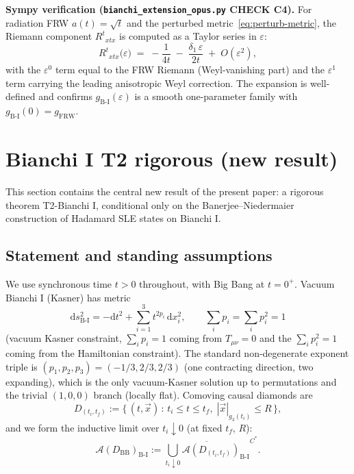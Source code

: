 \documentclass[11pt]{article}
\theoremstyle{definition}
\renewcommand{\AA}{\mathcal{A}}
\newcommand{\FRW}{\mathrm{FRW}}
\newcommand{\BI}{\mathrm{B\text{-}I}}
\newcommand{\BB}{\mathrm{BB}}
\begin{document}
\noindent\textbf{Sympy verification (\texttt{bianchi\_extension\_opus.py} CHECK C4).} For radiation FRW $a(t)=\sqrt t$ and the perturbed metric~\eqref{eq:perturb-metric}, the Riemann component $R^t{}_{xtx}$ is computed as a Taylor series in $\varepsilon$:
\begin{equation*}
R^t{}_{xtx}\bigl(\varepsilon\bigr)
   \;=\; -\frac{1}{4t} \;-\; \frac{\delta_1\,\varepsilon}{2t}\;+\;O(\varepsilon^2),
\end{equation*}
with the $\varepsilon^0$ term equal to the FRW Riemann (Weyl-vanishing part) and the $\varepsilon^1$ term carrying the leading anisotropic Weyl correction. The expansion is well-defined and confirms $g_\BI(\varepsilon)$ is a smooth one-parameter family with $g_\BI(0)=g_\FRW$.

\section{Bianchi I T2 rigorous (new result)}\label{sec:bianchi-T2}

This section contains the central new result of the present paper: a rigorous theorem T2-Bianchi I, conditional only on the Banerjee--Niedermaier~\cite{BanerjeeNiedermaier2023} construction of Hadamard SLE states on Bianchi I.

\subsection{Statement and standing assumptions}\label{sec:T2-statement}

We use synchronous time $t>0$ throughout, with Big Bang at $t=0^+$. Vacuum Bianchi I (Kasner) has metric
\begin{equation}\label{eq:kasner}
\mathrm{d}s^2_{\BI} = -\mathrm{d}t^2 + \sum_{i=1}^3 t^{2 p_i}\,\mathrm{d}x_i^2,\qquad
\sum_i p_i = \sum_i p_i^2 = 1
\end{equation}
(vacuum Kasner constraint, $\sum_i p_i = 1$ coming from $T_{\mu\nu}=0$ and the $\sum_i p_i^2 = 1$ coming from the Hamiltonian constraint). The standard non-degenerate exponent triple is $(p_1,p_2,p_3)=(-1/3,2/3,2/3)$ (one contracting direction, two expanding), which is the only vacuum-Kasner solution up to permutations and the trivial $(1,0,0)$ branch (locally flat). Comoving causal diamonds are
\begin{equation}\label{eq:diamond-bi}
D_{(t_i,t_f)} := \{\,(t,\vec x)\,:\,t_i \le t \le t_f,\;|\vec x|_{g_3(t_i)} \le R\,\},
\end{equation}
and we form the inductive limit over $t_i\downarrow 0$ (at fixed $t_f$, $R$):
\begin{equation}\label{eq:Dlim-bi}
\AA(D_\BB)_\BI := \overline{\bigcup_{t_i\downarrow 0} \AA(D_{(t_i,t_f)})_\BI}^{C^*}.
\end{equation}
\end{document}
